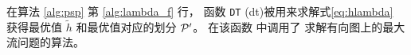 在算法 \ref{alg:psp} 第 \ref{alg:lambda_f} 行，
函数 \texttt{DT} (\glsdesc{dt})被用来求解式\eqref{eq:hlambda} 获得最优值
$\tilde{h}$ 和最优值对应的划分 $\P'$。
%
在该函数
中调用了
求解有向图上的最大流问题的算法。
%
